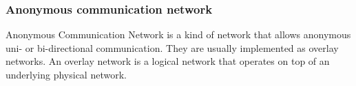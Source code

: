 \subsubsection{Anonymous communication network}
Anonymous Communication Network is a kind of network that allows anonymous uni- or bi-directional communication. They are usually implemented as overlay networks. An overlay network is a logical network that operates on top of an underlying physical network.





